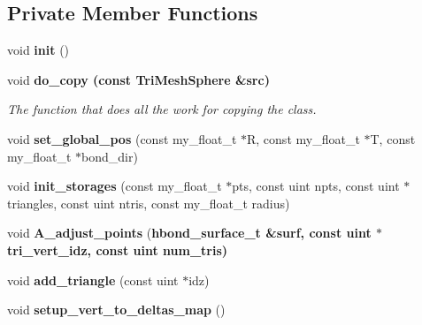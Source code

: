 \subsection*{Private Member Functions}
\begin{CompactItemize}
\item 
void \textbf{init} ()\label{classSimSite3D_1_1geometry_1_1TriMeshSphere_08a7be3e5e7bed201fa7f24da0d18b47}

\item 
void \bf{do\_\-copy} (const \bf{Tri\-Mesh\-Sphere} \&src)\label{classSimSite3D_1_1geometry_1_1TriMeshSphere_140990c6bc17c7f0f46950c2262fe0e5}

\begin{CompactList}\small\item\em The function that does all the work for copying the class. \item\end{CompactList}\item 
void \textbf{set\_\-global\_\-pos} (const my\_\-float\_\-t $\ast$R, const my\_\-float\_\-t $\ast$T, const my\_\-float\_\-t $\ast$bond\_\-dir)\label{classSimSite3D_1_1geometry_1_1TriMeshSphere_dd481c24ae86c6ccab7eae4965d44beb}

\item 
void \textbf{init\_\-storages} (const my\_\-float\_\-t $\ast$pts, const uint npts, const uint $\ast$triangles, const uint ntris, const my\_\-float\_\-t radius)\label{classSimSite3D_1_1geometry_1_1TriMeshSphere_19b9aa460a8c48a1ebe6eff1c0ecee43}

\item 
void \textbf{A\_\-adjust\_\-points} (\bf{hbond\_\-surface\_\-t} \&surf, const uint $\ast$tri\_\-vert\_\-idz, const uint num\_\-tris)\label{classSimSite3D_1_1geometry_1_1TriMeshSphere_3cbe2b20213813abb31e070f5898d7b2}

\item 
void \textbf{add\_\-triangle} (const uint $\ast$idz)\label{classSimSite3D_1_1geometry_1_1TriMeshSphere_533c34ac5b9c4435802391c6e5329048}

\item 
void \textbf{setup\_\-vert\_\-to\_\-deltas\_\-map} ()\label{classSimSite3D_1_1geometry_1_1TriMeshSphere_bba5d7fbb2e79443cf7294b0fed4662c}

\end{CompactItemize}
